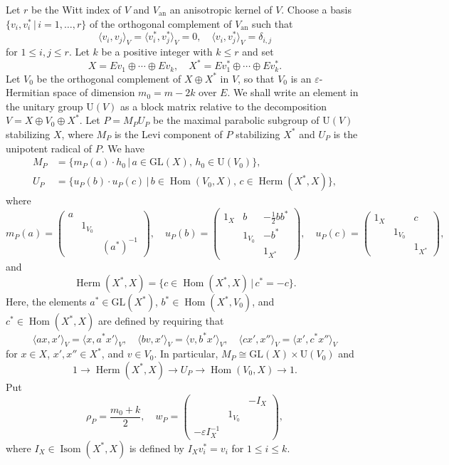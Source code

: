 \documentclass[11pt]{amsart}
\numberwithin{equation}{section}
\theoremstyle{plain}
\theoremstyle{definition}
\theoremstyle{remark}
\def\Herm{\operatorname{Herm}}
\def\Hom{\operatorname{Hom}}
\def\Isom{\operatorname{Isom}}
\def\an{\mathrm{an}}
\def\GL{\mathrm{GL}}
\def\U{\mathrm{U}}
\begin{document}
Let $r$ be the Witt index of $V$ and $V_\an$ an anisotropic kernel of $V$.
Choose a basis $\{ v_i, v_i^* \, | \, i = 1, \ldots, r \}$ of the orthogonal complement of $V_\an$ such that 
\[
 \langle v_i, v_j \rangle_V = \langle v^*_i, v^*_j \rangle_V = 0, \quad 
 \langle v_i, v^*_j \rangle _V = \delta_{i,j}
\]
for $1 \le i, j \le r$.
Let $k$ be a positive integer with $k \le r$ and set 
\[
 X = E v_1 \oplus \cdots \oplus E v_k, \quad X^* = E v^*_1 \oplus \cdots \oplus E v^*_k.
\]
Let $V_0$ be the orthogonal complement of $X \oplus X^*$ in $V$, so that $V_0$ is an $\varepsilon$-Hermitian space of dimension $m_0 = m -2k$ over $E$.
We shall write an element in the unitary group $\U(V)$ as a block matrix relative to the decomposition $V = X \oplus V_0 \oplus X^*$.
Let $P = M_P U_P$ be the maximal parabolic subgroup of $\U(V)$ stabilizing $X$,
where $M_P$ is the Levi component of $P$ stabilizing $X^*$ and $U_P$ is the unipotent radical of $P$. We have
\begin{align*}
 M_P & = \{ m_P(a) \cdot h_0 \, | \, a \in \GL(X), \, h_0 \in \U(V_0) \}, \\
 U_P & = \{ u_P(b) \cdot u_P(c) \, | \, b \in \Hom(V_0, X), \,  c \in \Herm(X^*,X) \}, 
\end{align*}
where 
\[
 m_P(a) = 
 \begin{pmatrix}
  a & & \\
  & 1_{V_0} & \\
  & & (a^*)^{-1}
 \end{pmatrix}, \quad
 u_P(b) = 
 \begin{pmatrix}
  1_X & b & - \tfrac{1}{2} b b^* \\
  & 1_{V_0} & -b^* \\
  & & 1_{X^*}
 \end{pmatrix}, \quad
 u_P(c) = 
 \begin{pmatrix}
  1_X & & c \\
  & 1_{V_0} & \\
  & & 1_{X^*}
 \end{pmatrix},
\]
and 
\[
 \Herm(X^*, X) = \{ c \in \Hom(X^*,X) \, | \, c^* = -c \}.
\]
Here, the elements $a^* \in \GL(X^*)$, $b^* \in \Hom(X^*, V_0)$, and $c^* \in \Hom(X^*, X)$ are defined by requiring that
\[
 \langle a x, x' \rangle_V = \langle x, a^* x' \rangle_V, \quad
 \langle b v, x' \rangle_V = \langle v, b^* x' \rangle_V, \quad
 \langle c x', x'' \rangle_V  = \langle x', c^* x'' \rangle_V
\]
for $x \in X$, $x', x'' \in X^*$, and $v \in V_0$.
In particular, $M_P \cong \GL(X) \times \U(V_0)$ and 
\[
 1 \longrightarrow \Herm(X^*,X) \longrightarrow U_P \longrightarrow 
 \Hom(V_0, X) \longrightarrow 1.
\]
Put
\[
 \rho_P = \frac{m_0+k}{2}, \quad 
 w_P =
 \begin{pmatrix}
  & & -I_X \\
  & 1_{V_0} & \\
  -\varepsilon I_X^{-1} & & 
 \end{pmatrix},
\]
where $I_X \in \Isom(X^*, X)$ is defined by $I_X v_i^* = v_i$ for $1 \le i \le k$.
\end{document}
